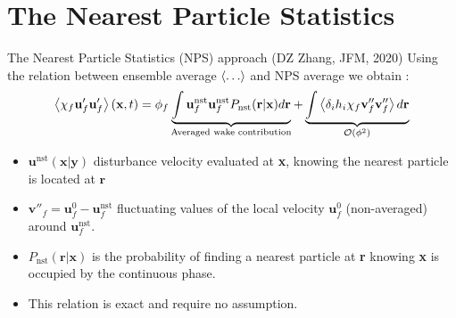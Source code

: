 \documentclass{sintefbeamer}
\begin{document}
\section{The Nearest Particle Statistics}



\begin{frame}{The Nearest Particle Statistics (NPS) approach (DZ Zhang, JFM, 2020)}
  Using the relation between ensemble average $\left<\ldots\right>$ and NPS average we obtain :
  \begin{equation*}
    \left<\chi_f \textbf{u}'_f\textbf{u}'_f\right>(\textbf{x},t)
    = \phi_f
    \underbrace{\int 
      \textbf{u}^\text{nst}_f
      \textbf{u}^\text{nst}_f 
      P_\text{nst}(\textbf{r}|\textbf{x}) d\textbf{r} 
    }_\text{Averaged wake contribution}
    + \underbrace{ 
      \int \left<\delta_i h_i \chi_f \textbf{v}_f''\textbf{v}_f''\right>  d\textbf{r}
    }_{\mathcal{O}(\phi^2)}
  \end{equation*}

\begin{itemize}
  \item $\textbf{u}^\text{nst}(\textbf{x}|\textbf{y})$ disturbance velocity evaluated at \textbf{x}, knowing the nearest particle is located at $\textbf{r}$
  \item $\textbf{v}''_f = \textbf{u}^0_f - \textbf{u}^\text{nst}_f$ fluctuating values of the local velocity $\textbf{u}_f^0$ (non-averaged) around $\textbf{u}_f^\text{nst}$.
  \item $P_\text{nst}(\textbf{r}|\textbf{x})$ is the probability of finding a nearest particle at \textbf{r} knowing \textbf{x} is occupied by the continuous phase.   
  \item This relation is exact and require no assumption. 
\end{itemize}
\end{frame}
\end{document}
